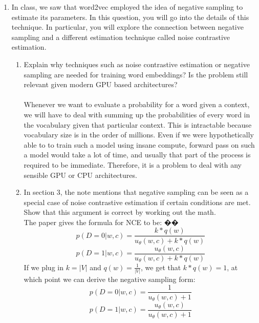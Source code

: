 \documentclass{article}
\begin{document}
\begin{enumerate}

\item In class, we saw that word2vec employed the idea of negative sampling to estimate its parameters. In this question, you will go into the details of this technique. In particular, you will explore the connection between negative sampling and a different estimation technique called noise contrastive estimation.

\begin{enumerate}
\item Explain why techniques such as noise contrastive estimation or negative sampling are needed for training word embeddings? Is the problem still relevant given modern GPU based architectures?\\~\\
Whenever we want to evaluate a probability for a word given a context, we will have to deal with summing up the probabilities of every word in the vocabulary given that particular context. This is intractable because vocabulary size is in the order of millions. Even if we were hypothetically  able to to train such a model using insane compute, forward pass on such a model would take a lot of time, and usually that part of the process is required to be immediate. Therefore, it is a problem to deal with any sensible GPU or CPU architectures.\\
\item In section 3, the note mentions that negative sampling can be seen as a special case of noise contrastive estimation if certain conditions are met. Show that this argument is correct by working out the math.\\
The paper gives the formula for NCE to be:
�� $$p(D=0| w ,c) = \frac{k * q(w)}{u_\theta(w,c) + k * q(w)} $$
$$p(D=1| w ,c) = \frac{u_\theta(w,c)}{u_\theta(w,c) + k * q(w)} $$
If we plug in $k = |V|$ and $q(w) = \frac{1}{|V|}$, we get that $ k * q(w) = 1$, at which point we can derive the negative sampling form:
$$p(D=0| w ,c) = \frac{1}{u_\theta(w,c) + 1} $$
$$p(D=1| w ,c) = \frac{u_\theta(w,c)}{u_\theta(w,c) + 1} $$
\end{enumerate}




\end{enumerate}
\end{document}
